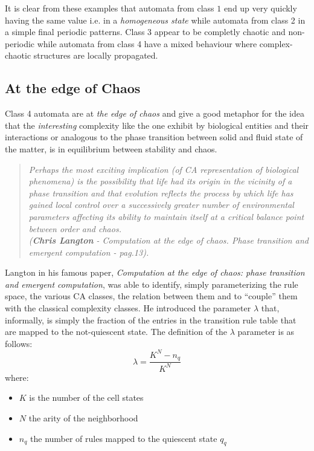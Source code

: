 It is clear from these examples that automata from class $1$ end up very quickly having the same value i.e. in a \textit{homogeneous state} while automata
from class 2 in a simple final periodic patterns.
Class 3 appear to be completly chaotic and non-periodic while automata from class 4 have
a mixed behaviour where complex-chaotic structures are locally propagated.
\subsection{At the edge of Chaos}
Class 4 automata are at \emph{the edge of chaos} and give a good metaphor for
the idea that the \textit{interesting} complexity like the one exhibit by
biological entities and their interactions or analogous to the phase transition
between solid and fluid state of the matter, is in equilibrium between
stability and chaos\cite{Langton1990}.
\begin{quotation}
\em Perhaps the most exciting implication (of CA representation of biological
phenomena) is the possibility that life had its origin in the vicinity of a
phase transition and that evolution reflects the process by which life has
gained local control over a successively greater number of environmental
parameters affecting its ability to maintain itself at a critical balance point
between order and chaos.\\
(\textit{\textbf{Chris Langton} - Computation at the edge of chaos.
Phase transition and emergent computation - pag.13}).
\end{quotation}


Langton in his famous paper, \textit{Computation at the edge of chaos: phase
transition and emergent computation}\cite{Langton1990}, was able to
identify, simply parameterizing the rule space, the various CA classes, the
relation between them and to ``couple'' them with the classical complexity classes.
He introduced the parameter $\lambda$\cite{LangtonThesis1990} that, informally, is simply
the fraction of the entries in the transition rule table that are mapped to the
not-quiescent state.
The definition of the $\lambda$ parameter is as follows:
\[\lambda=\frac{K^N-n_q}{K^N}\]
where:
\begin{itemize}
  \item $K$ is the number of the cell states
  \item $N$ the arity of the neighborhood
  \item $n_q$ the number of rules mapped to the quiescent
  state $q_q$
\end{itemize}

